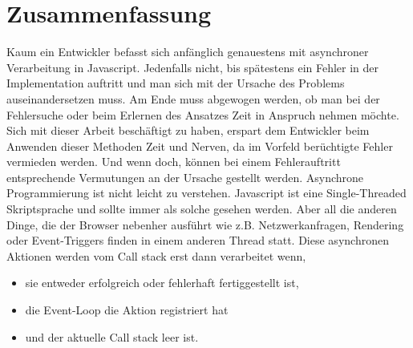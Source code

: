 \section{Zusammenfassung}

Kaum ein Entwickler befasst sich anfänglich genauestens mit asynchroner Verarbeitung in Javascript. Jedenfalls nicht, bis spätestens ein Fehler in der Implementation auftritt und man sich mit der Ursache des Problems auseinandersetzen muss. Am Ende muss abgewogen werden, ob man bei der Fehlersuche oder beim Erlernen des Ansatzes Zeit in Anspruch nehmen möchte. Sich mit dieser Arbeit beschäftigt zu haben, erspart dem Entwickler beim Anwenden dieser Methoden Zeit und Nerven, da im Vorfeld berüchtigte Fehler vermieden werden. Und wenn doch, können bei einem Fehlerauftritt entsprechende Vermutungen an der Ursache gestellt werden. Asynchrone Programmierung ist nicht leicht zu verstehen. Javascript ist eine Single-Threaded Skriptsprache und sollte immer als solche gesehen werden. Aber all die anderen Dinge, die der Browser nebenher ausführt wie z.B. Netzwerkanfragen, Rendering oder Event-Triggers finden in einem anderen Thread statt. Diese asynchronen Aktionen werden vom Call stack erst dann verarbeitet wenn, 

\begin{itemize}
\item sie entweder erfolgreich oder fehlerhaft fertiggestellt ist,
\item die Event-Loop die Aktion registriert hat
\item und der aktuelle Call stack leer ist.
\end{itemize}

